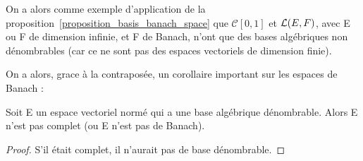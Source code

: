 On a alors comme exemple d'application de la
proposition~\ref{proposition_basis_banach_space} que $\mathcal{C}[0, 1]$ et
$\mathcal{L}(E, F)$, avec E ou F de dimension infinie, et F de Banach,
n'ont que des bases algébriques non dénombrables (car ce ne sont pas des espaces
vectoriels de dimension finie).

On a alors, grace à la contraposée, un corollaire important sur les espaces de
Banach :

\begin{corollary}
	Soit E un espace vectoriel normé qui a une base algébrique dénombrable.
	Alors E n'est pas complet (ou E n'est pas de Banach).
\end{corollary}

\begin{proof}
	S'il était complet, il n'aurait pas de base dénombrable.
\end{proof}
